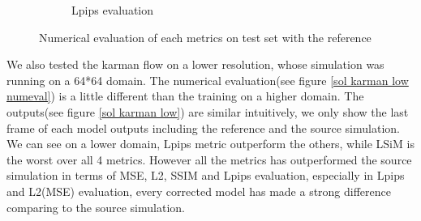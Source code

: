 \documentclass[a4paper,12pt,twoside]{report}
\begin{document}
\begin{figure}
\begin{subfigure}{0.32\textwidth}
		\caption{Lpips evaluation}
	\end{subfigure}
	\caption{Numerical evaluation of each metrics on test set with the reference}
	\label{sol karman high numeval}
\end{figure}

We also tested the karman flow on a lower resolution, whose simulation was running on a 64*64 domain.
The numerical evaluation(see figure \ref{sol karman low numeval}) is a little different than the training on a higher domain. The outputs(see figure \ref{sol karman low}) are similar intuitively, we only show the last frame of each model outputs including the reference and the source simulation.
We can see on a lower domain, Lpips metric outperform the others, while LSiM is the worst over all 4 metrics. However all the metrics has outperformed the source simulation in terms of MSE, L2, SSIM and Lpips evaluation, especially in Lpips and L2(MSE) evaluation, every corrected model has made a strong difference comparing to the source simulation.  
\end{document}
